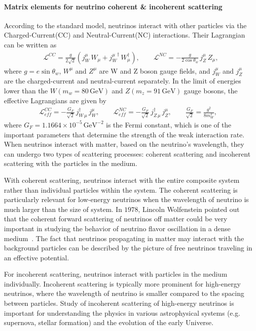 \paragraph{Matrix elements for neutrino coherent \& incoherent scattering}
 According to the standard model, neutrinos interact with other particles via the Charged-Current(CC) and Neutral-Current(NC) interactions. Their Lagrangian can be written as~\cite{Giunti:2007ry}
\begin{align}
&\mathcal{L}^{CC}=\frac{g}{2\sqrt{2}}\left(j^\mu_W\,W_\mu+{j^\mu_W}^\dagger\,W^\dagger_\mu\right),\qquad\mathcal{L}^{NC}=-\frac{g}{2\cos{\theta_w}}\,j^\mu_Z\,Z_\mu,
\end{align}
where $g=e\sin\theta_w$, $W^\mu$ and $Z^\mu$ are W and Z boson gauge fields, and $j^\mu_W$ and $j^\mu_Z$ are the charged-current and neutral-current separately. In the limit of energies lower than the $W(m_w=80\,\mathrm{GeV})$ and $Z(m_z=91\,\mathrm{GeV})$ gauge bosons, the effective Lagrangians are given by
\begin{align}\label{L_low}
\mathcal{L}^{CC}_{eff}=-\frac{G_F}{\sqrt{2}}\,j^\dagger_{W\,\mu}\,j^\mu_W,\qquad
\mathcal{L}^{NC}_{eff}=-\frac{G_F}{\sqrt{2}}\,j^\dagger_{Z\,\mu}\,j^\mu_Z,\qquad \frac{G_F}{\sqrt{2}}=\frac{g^2}{8m^2_W},
\end{align}
where $G_F=1.1664\times10^{-5}\,\mathrm{GeV}^{-2}$ is the Fermi constant, which is one of the important parameters that determine the strength of the weak interaction rate. When neutrinos interact with matter, based on the neutrino's wavelength, they can undergo two types of scattering processes: coherent scattering and incoherent scattering with the particles in the medium. 

With coherent scattering, neutrinos interact with the entire  composite system rather than individual particles within the system. The coherent scattering is particularly relevant for low-energy neutrinos when the wavelength of neutrino is much larger than the size of system. In $1978$, Lincoln Wolfenstein pointed out that the coherent forward scattering of neutrinos off matter could be very important in studying the behavior of neutrino flavor oscillation in a dense medium~\cite{Wolfenstein:1977ue}. The fact that neutrinos propagating in matter may interact with the background particles can be described by the picture of free neutrinos traveling in an effective potential.

For incoherent scattering, neutrinos interact with particles in the medium individually. Incoherent scattering is typically more prominent for high-energy neutrinos, where the wavelength of neutrino is smaller compared to the spacing between particles. Study of incoherent scattering of high-energy neutrinos is important for understanding the physics in various astrophysical systems (e.g. supernova, stellar formation) and the evolution of the early Universe.

